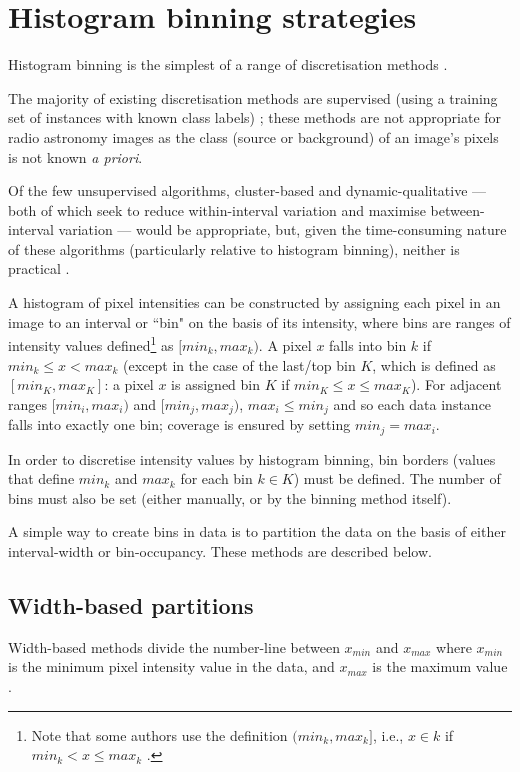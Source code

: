 \section{Histogram binning strategies}\label{sec:binning-strategies}
Histogram binning is the simplest of a range of discretisation methods \cite{kotsiantis2006discretization,liu2002discretization,yang2010discretization}.

The majority of existing discretisation methods are supervised (using a training set of instances with known class labels) \cite{kotsiantis2006discretization,liu2002discretization,yang2010discretization}; these methods are not appropriate for radio astronomy images as the class (source or background) of an image's pixels is not known \textit{a priori}. 

Of the few unsupervised algorithms, cluster-based \cite{chmielewski1996global} and dynamic-qualitative \cite{lopez2000dynamic} --- both of which seek to reduce within-interval variation and maximise between-interval variation --- would be appropriate, but, given the time-consuming nature of these algorithms (particularly relative to histogram binning), neither is practical \cite{yang2010discretization}.

A histogram of pixel intensities can be constructed by assigning each pixel in an image to an interval or ``bin" on the basis of its intensity, where bins are ranges of intensity values defined\footnote{Note that some authors use the definition $(min_k, max_k]$, i.e., $x \in k$ if $min_k < x \le max_k$ \cite{kotsiantis2006discretization}.} as $[min_k, max_k)$. A pixel $x$ falls into bin $k$ if $min_k \le x < max_k$ (except in the case of the last/top bin $K$, which is defined as $[min_K, max_K]$: a pixel $x$ is assigned bin $K$ if $min_K \le x \le max_K$). For adjacent ranges $[min_i, max_i)$ and $[min_j, max_j)$, $max_i \le min_j$ and so each data instance falls into exactly one bin; coverage is ensured by setting $min_j = max_i$.

In order to discretise intensity values by histogram binning, bin borders (values that define $min_k$ and $max_k$ for each bin $k \in K$) must be defined. The number of bins must also be set (either manually, or by the binning method itself). 

A simple way to create bins in data is to partition the data on the basis of either interval-width or bin-occupancy. These methods are described below.

\subsection{Width-based partitions}\label{sec:width}
Width-based methods divide the number-line between $x_{min}$ and $x_{max}$  where $x_{min}$ is the minimum pixel intensity value in the data, and $x_{max}$ is the maximum value \cite{yang2010discretization}.

